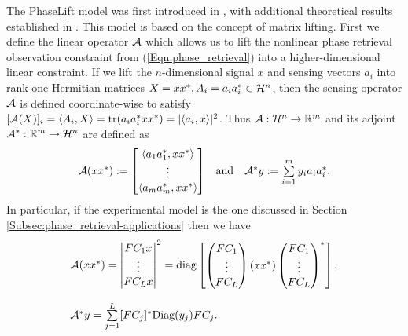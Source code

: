 The PhaseLift model was first introduced in \cite{DBLP:journals/siamis/CandesESV13}, with additional theoretical results established in \cite{candes2013phaselift}.  This model is based on the concept of matrix lifting.  First we define the linear operator ${\mathcal A}$ which allows us to lift the nonlinear phase retrieval observation constraint from (\ref{Eqn:phase_retrieval}) into a higher-dimensional linear constraint.  If we lift the $n$-dimensional signal $x$ and sensing vectors $a_i$ into rank-one Hermitian matrices $X = xx^*, A_i = a_ia_i^* \in {\mathcal H}^n$, then the sensing operator ${\mathcal A}$ is defined coordinate-wise to satisfy $[{\mathcal A} (X)]_i = \langle A_i, X \rangle = \mathrm{tr}( a_i a_i^* xx^* )= | \langle a_i, x \rangle |^2$.  Thus ${\mathcal A}: {\mathcal H}^n \rightarrow {\mathbb R}^m$ and its adjoint ${\mathcal A}^* : {\mathbb R}^m \rightarrow {\mathcal H}^n$ are defined as
\begin{equation} 			\label{Eqn:A_definition}
\begin{array}{lcr}
{\mathcal A}(xx^*)
	:= \begin{bmatrix} \langle a_1 a_1^*, xx^* \rangle \\ \vdots \\ \langle a_m a_m^*, xx^* \rangle \end{bmatrix}
		
	& 	\text{and}
		&	{\mathcal A}^*y
			  := \sum\limits_{\substack{i = 1}}^{\substack{m}} y_ia_ia_i^*.
\end{array}
\end{equation}
In particular, if the experimental model is the one discussed in Section \ref{Subsec:phase_retrieval-applications} then we have
\begin{equation} 			\label{Eqn:A_definition_with_masks}
\begin{array}{l}
{\mathcal A}(xx^*)
		= \begin{vmatrix}
				FC_1x \\ \vdots \\ FC_Lx
			\end{vmatrix}^2
			= \textnormal{diag}\begin{bmatrix}
			\begin{pmatrix}
			FC_1 \\ \vdots \\ FC_L
			\end{pmatrix}
		 	(xx^*)
	 		\begin{pmatrix}
			FC_1 \\ \vdots \\ FC_L
		 	\end{pmatrix}^*
		\end{bmatrix},
									\\
									\\
{\mathcal A}^*y
			  =\sum\limits_{\substack{j=1}}^{\substack{L}}
					[FC_j]^* \textnormal{Diag}(y_j) F C_j.
\end{array}
\end{equation}






